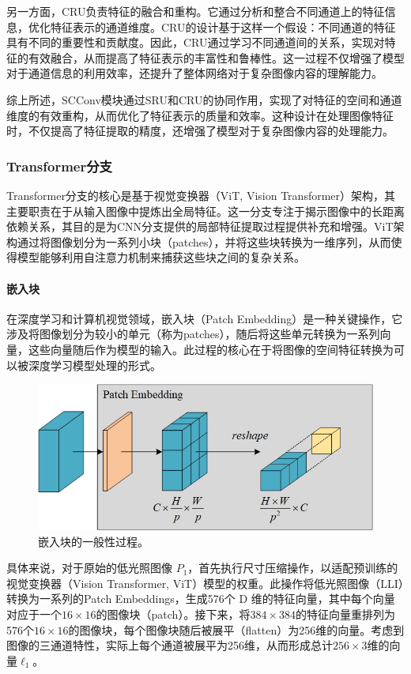 \documentclass[a4paper]{ctexart}
\begin{document}
	另一方面，CRU负责特征的融合和重构。它通过分析和整合不同通道上的特征信息，优化特征表示的通道维度。CRU的设计基于这样一个假设：不同通道的特征具有不同的重要性和贡献度。因此，CRU通过学习不同通道间的关系，实现对特征的有效融合，从而提高了特征表示的丰富性和鲁棒性。这一过程不仅增强了模型对于通道信息的利用效率，还提升了整体网络对于复杂图像内容的理解能力。
	
	综上所述，SCConv模块通过SRU和CRU的协同作用，实现了对特征的空间和通道维度的有效重构，从而优化了特征表示的质量和效率。这种设计在处理图像特征时，不仅提高了特征提取的精度，还增强了模型对于复杂图像内容的处理能力。
	
	\subsubsection{Transformer分支}
	
	Transformer分支的核心是基于视觉变换器（ViT, Vision Transformer）架构，其主要职责在于从输入图像中提炼出全局特征。这一分支专注于揭示图像中的长距离依赖关系，其目的是为CNN分支提供的局部特征提取过程提供补充和增强。ViT架构通过将图像划分为一系列小块（patches），并将这些块转换为一维序列，从而使得模型能够利用自注意力机制来捕获这些块之间的复杂关系。
	
	\paragraph{嵌入块}
	
	在深度学习和计算机视觉领域，嵌入块（Patch Embedding）是一种关键操作，它涉及将图像划分为较小的单元（称为patches），随后将这些单元转换为一系列向量，这些向量随后作为模型的输入。此过程的核心在于将图像的空间特征转换为可以被深度学习模型处理的形式。
	
	\begin{figure}[htb]
		\centering 
		\includegraphics[width=0.5\columnwidth]{picture/LLIE/My Architecture/Patch Embedding}
		\caption{
			\label{fig: Patch Embedding} 
			嵌入块的一般性过程。
		}
	\end{figure}
	
	具体来说，对于原始的低光照图像 $P_1$，首先执行尺寸压缩操作，以适配预训练的视觉变换器（Vision Transformer, ViT）模型的权重。此操作将低光照图像（LLI）转换为一系列的Patch Embeddings，生成576个 D 维的特征向量，其中每个向量对应于一个$16 \times 16$的图像块（patch）。接下来，将$384 \times 384$的特征向量重排列为576个$16\times16$的图像块，每个图像块随后被展平（flatten）为256维的向量。考虑到图像的三通道特性，实际上每个通道被展平为256维，从而形成总计$256 \times 3$维的向量$\ell_1$。
	
\end{document}
